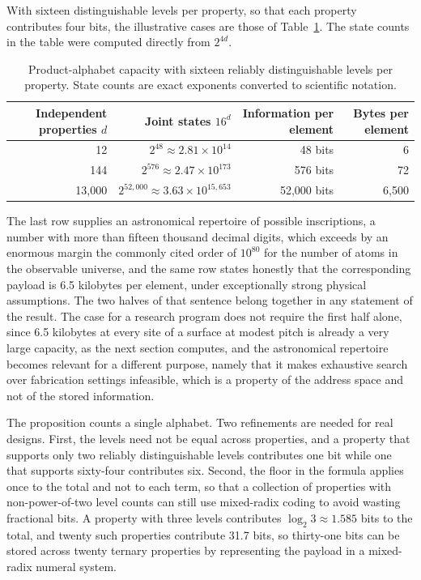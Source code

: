 With sixteen distinguishable levels per property, so that each property contributes four bits, the illustrative cases are those of Table~\ref{tab:states}. The state counts in the table were computed directly from $2^{4d}$.

\begin{table}[h]
\centering
\small
\begin{tabular}{@{}rrrr@{}}
\toprule
Independent properties $d$ & Joint states $16^{d}$ & Information per element & Bytes per element \\
\midrule
12 & $2^{48}\approx 2.81\times10^{14}$ & 48 bits & 6 \\
144 & $2^{576}\approx 2.47\times10^{173}$ & 576 bits & 72 \\
13{,}000 & $2^{52{,}000}\approx 3.63\times10^{15{,}653}$ & 52{,}000 bits & 6{,}500 \\
\bottomrule
\end{tabular}
\caption{Product-alphabet capacity with sixteen reliably distinguishable levels per property. State counts are exact exponents converted to scientific notation.}
\label{tab:states}
\end{table}

The last row supplies an astronomical repertoire of possible inscriptions, a number with more than fifteen thousand decimal digits, which exceeds by an enormous margin the commonly cited order of $10^{80}$ for the number of atoms in the observable universe, and the same row states honestly that the corresponding payload is 6.5 kilobytes per element, under exceptionally strong physical assumptions. The two halves of that sentence belong together in any statement of the result. The case for a research program does not require the first half alone, since 6.5 kilobytes at every site of a surface at modest pitch is already a very large capacity, as the next section computes, and the astronomical repertoire becomes relevant for a different purpose, namely that it makes exhaustive search over fabrication settings infeasible, which is a property of the address space and not of the stored information.

The proposition counts a single alphabet. Two refinements are needed for real designs. First, the levels need not be equal across properties, and a property that supports only two reliably distinguishable levels contributes one bit while one that supports sixty-four contributes six. Second, the floor in the formula applies once to the total and not to each term, so that a collection of properties with non-power-of-two level counts can still use mixed-radix coding to avoid wasting fractional bits. A property with three levels contributes $\log_2 3\approx 1.585$ bits to the total, and twenty such properties contribute 31.7 bits, so thirty-one bits can be stored across twenty ternary properties by representing the payload in a mixed-radix numeral system.

